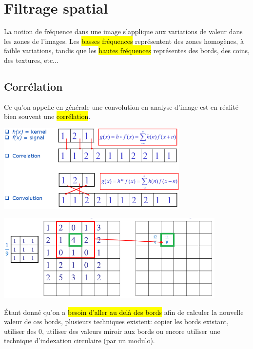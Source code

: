 \documentclass[letterpaper, 12pt]{article}
\newcommand{\alinea}{
\hspace*{0.5cm}}
\begin{document}
\section{Filtrage spatial}
	\alinea La notion de fréquence dans une image s'applique aux variations de valeur dans les zones de l'images.
		Les \hl{basses fréquences} représentent des zones homogènes, à faible variations, tandis que les \hl{hautes fréquences}
		représentes des bords, des coins, des textures, etc...
	\subsection{Corrélation}
		\alinea Ce qu'on appelle en générale une convolution en analyse d'image est en réalité bien souvent une \hl{corrélation}.
			\begin{center}
				\includegraphics[width=3.75in]{Images/correlation}
			\end{center}
			\begin{center}
				\includegraphics[width=4.5in]{Images/correlation2}
			\end{center}
		\alinea \'Etant donné qu'on a \hl{besoin d'aller au delà des bords} afin de calculer la nouvelle valeur de ces bords, plusieurs
			techniques existent: copier les bords existant, utiliser des 0, utiliser des valeurs miroir aux bords ou encore
			utiliser une technique d'indexation circulaire (par un modulo).
\end{document}

